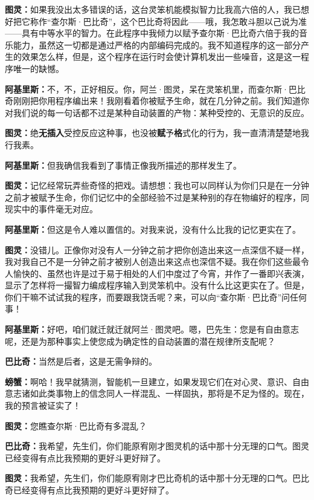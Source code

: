 \documentclass[
  12pt,
  twoside,
  openright,
  oldfontcommands,
]{memoir}
\newcommand{\heititext}[1]{{\sffamily\bfseries #1}}
\newcommand{\dialogname}[1]{{\sffamily\bfseries #1}}
\begin{document}
\dialogname{图灵：}如果我没出太多错误的话，这台灵笨机能模拟智力比我高六倍的人，我已想好把它称作``查尔斯·巴比奇''，这个巴比奇将因此------哦，我怎敢斗胆以己说为准------具有中等水平的智力。在此程序中我倾力以赋予查尔斯·巴比奇六倍于我的音乐能力，虽然这一切都是通过严格的内部编码完成的。我不知道程序的这一部分产生的效果怎么样，但是，这个程序在运行时会使计算机发出一些噪音，这是这一程序唯一的缺憾。

\dialogname{阿基里斯：}不，不，正好相反。你，阿兰·图灵，呆在灵笨机里，而查尔斯·巴比奇刚刚把你用程序编出来！我刚看着你被赋予生命，就在几分钟之前。我们知道你对我们说的每一句话都不过是某种自动装置的产物：某种受控的、无意识的反应。

\dialogname{图灵：}绝\heititext{无插入}受控反应这种事，也没被\heititext{赋}予\heititext{格}式化的行为，我一直清清楚楚地我行我素。

\dialogname{阿基里斯：}但我确信我看到了事情正像我所描述的那样发生了。

\dialogname{图灵：}记忆经常玩弄些奇怪的把戏。请想想：我也可以同样认为你们只是在一分钟之前才被赋予生命，你们记忆中的全部经验不过是某种别的存在物编好的程序，同现实中的事件毫无对应。

\dialogname{阿基里斯：}但这是令人难以置信的。对我来说，没有什么比我的记忆更实在了。

\dialogname{图灵：}没错儿。正像你对没有人一分钟之前才把你创造出来这一点深信不疑一样，我对我自己不是一分钟之前才被别人创造出来这点也深信不疑。我在你们这些最令人愉快的、虽然也许是过于易于相处的人们中度过了今宵，并作了一番即兴表演，显示了怎样将一撮智力编成程序输入到灵笨机中。没有什么比这更实在了。但是，你们干嘛不试试我的程序，而要跟我饶舌呢？来，可以向``查尔斯·巴比奇''问任何事！

\dialogname{阿基里斯：}好吧，咱们就迁就迁就阿兰·图灵吧。嗯，巴先生：您是有自由意志呢，还是为那种事实上使您成为确定性的自动装置的潜在规律所支配呢？

\dialogname{巴比奇：}当然是后者，这是无需争辩的。

\dialogname{螃蟹：}啊哈！我早就猜测，智能机一旦建立，如果发现它们在对心灵、意识、自由意志诸如此类事物上的信念同人一样混乱、一样固执，那将是不足为怪的。现在，我的预言被证实了！

\dialogname{图灵：}您瞧查尔斯·巴比奇有多混乱？

\dialogname{巴比奇：}我希望，先生们，你们能原宥刚才图灵机的话中那十分无理的口气。图灵已经变得有点比我预期的更好斗更好辩了。

\dialogname{图灵：}我希望，先生们，你们能原宥刚才巴比奇机的话中那十分无理的口气。巴比奇已经变得有点比我预期的更好斗更好辩了。
\end{document}
